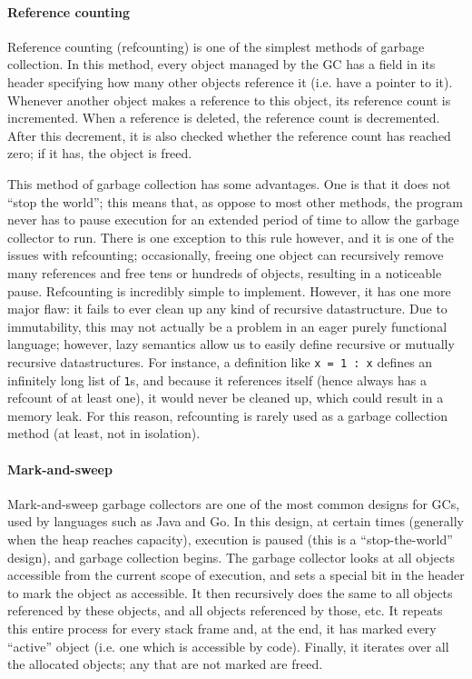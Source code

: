 \documentclass[9pt]{extarticle}
\begin{document}
\paragraph{Reference counting}

Reference counting (refcounting) is one of the simplest methods of
garbage collection. In this method, every object managed by the GC has a
field in its header specifying how many other objects reference it (i.e.
have a pointer to it). Whenever another object makes a reference to this
object, its reference count is incremented. When a reference is deleted,
the reference count is decremented. After this decrement, it is also
checked whether the reference count has reached zero; if it has, the
object is freed.

This method of garbage collection has some advantages. One is that it
does not ``stop the world''; this means that, as oppose to most other
methods, the program never has to pause execution for an extended period
of time to allow the garbage collector to run. There is one exception to
this rule however, and it is one of the issues with refcounting;
occasionally, freeing one object can recursively remove many references
and free tens or hundreds of objects, resulting in a noticeable pause.
Refcounting is incredibly simple to implement. However, it has one more
major flaw: it fails to ever clean up any kind of recursive
datastructure. Due to immutability, this may not actually be a problem
in an eager purely functional language; however, lazy semantics allow us
to easily define recursive or mutually recursive datastructures. For
instance, a definition like \verb'x = 1 : x' defines an infinitely long
list of \verb'1's, and because it references itself (hence always has a
refcount of at least one), it would never be cleaned up, which could
result in a memory leak. For this reason, refcounting is rarely used as
a garbage collection method (at least, not in isolation).

\paragraph{Mark-and-sweep}

Mark-and-sweep garbage collectors are one of the most common designs for
GCs, used by languages such as Java and Go. In this design, at certain
times (generally when the heap reaches capacity), execution is paused
(this is a ``stop-the-world'' design), and garbage collection begins.
The garbage collector looks at all objects accessible from the current
scope of execution, and sets a special bit in the header to mark the
object as accessible. It then recursively does the same to all objects
referenced by these objects, and all objects referenced by those, etc.
It repeats this entire process for every stack frame and, at the end, it
has marked every ``active'' object (i.e. one which is accessible by
code). Finally, it iterates over all the allocated objects; any that are
not marked are freed.
\end{document}

